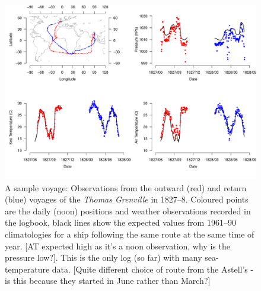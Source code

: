\documentclass[a4paper,11pt]{article}
\begin{document}
\begin{figure}
\begin{center}
\includegraphics[angle=0, width=1.0\textwidth]{../individual_logs/Thomas_Grenville_1827-8/Thomas_Grenville}
\caption{A sample voyage: Observations from the outward (red) and return (blue) voyages of the {\it Thomas Grenville} in 1827--8. Coloured points are the daily (noon) positions and weather observations recorded in the logbook, black lines show the expected values from 1961--90 climatologies for a ship following the same route at the same time of year. [AT expected high as it's a noon observation, why is the pressure low?]. This is the only log (so far) with many sea-temperature data. [Quite different choice of route from the Astell's - is this because they started in June rather than March?]}
\label{thomas_grenville}
\end{center}
\end{figure}
\end{document}
